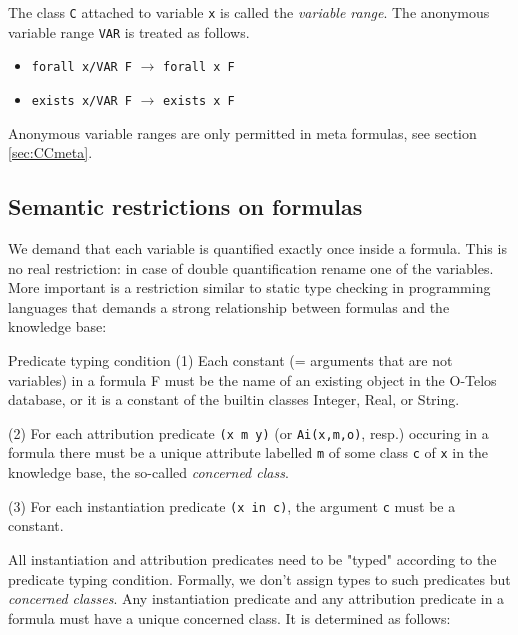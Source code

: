 The class {\tt C} attached to variable {\tt x} is called the {\em variable range}.
The anonymous variable range {\tt VAR} is treated as follows.

\begin{itemize}
\item {\tt forall x/VAR F}  \hfill $\rightarrow$  \hfill {\tt forall x F} \hfill \hbox{}
\item {\tt exists x/VAR F}  \hfill $\rightarrow$  \hfill {\tt exists x F} \hfill \hbox{}
\end{itemize}

Anonymous variable ranges are only permitted in meta formulas, see section \ref{sec:CCmeta}. 

\subsection{Semantic restrictions on formulas}
\label{sec:SemFormula}

We demand that each variable is quantified exactly once inside a formula.
This is no real restriction: in case of double quantification rename one of
the variables. More important is a restriction similar to static type
checking in programming languages that demands a strong relationship
between formulas and the knowledge base:

\begin{axiom}{Predicate typing condition}
(1) Each constant (= arguments that are not variables) in a formula F must be
the name of an existing object in the O-Telos database, or it is a
constant of the builtin classes Integer, Real, or String. 

(2) For each attribution predicate {\tt (x m y)} (or {\tt Ai(x,m,o)}, resp.) occuring in a formula there must be a
unique attribute labelled {\tt m} of some class {\tt c} of {\tt x} in the knowledge base, 
the so-called {\em concerned class}.

(3) For each instantiation predicate {\tt (x in c)}, the argument {\tt c} must be a constant.
\end{axiom}

All instantiation and attribution predicates need to be "typed" according
to the predicate typing condition.
Formally, we don't assign types to such predicates but 
{\em concerned classes}. Any instantiation predicate and any attribution
predicate in a formula must have a unique concerned class. It is determined as follows:

